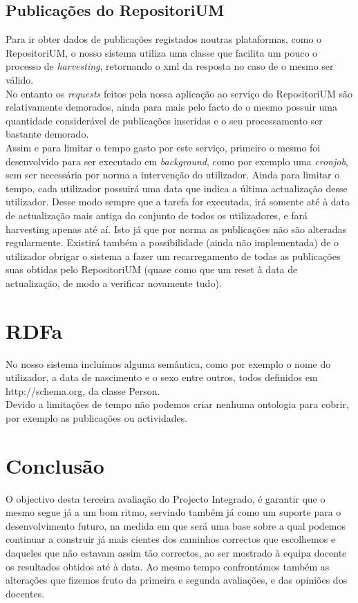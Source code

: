 \documentclass[a4paper,11pt,openright,openbib]{article}
\begin{document}
\subsection{Publicações do RepositoriUM}
Para ir obter dados de publicações registados noutras plataformas, como o RepositoriUM, o nosso sistema utiliza uma classe que facilita um pouco o processo de \emph{harvesting}, retornando o xml da resposta no caso de o mesmo ser válido.\\
No entanto os \emph{requests} feitos pela nossa aplicação ao serviço do RepositoriUM são relativamente demorados, ainda para mais pelo facto de o mesmo possuir uma quantidade considerável de publicações inseridas e o seu processamento ser bastante demorado.\\
Assim e para limitar o tempo gasto por este serviço, primeiro o mesmo foi desenvolvido para ser executado em \emph{background}, como por exemplo uma \emph{cronjob}, sem ser necessária por norma a intervenção do utilizador. Ainda para limitar o tempo, cada utilizador possuirá uma data que indica a última actualização desse utilizador. Desse modo sempre que a tarefa for executada, irá somente até à data de actualização mais antiga do conjunto de todos os utilizadores, e fará harvesting apenas até aí. Isto já que por norma as publicações não são alteradas regularmente. Existirá também a possibilidade (ainda não implementada) de o utilizador obrigar o sistema a fazer um recarregamento de todas as publicações suas obtidas pelo RepositoriUM (quase como que um reset à data de actualização, de modo a verificar novamente tudo).
\section{RDFa}
No nosso sistema incluímos alguma semântica, como por exemplo o nome do utilizador, a data de nascimento e o sexo entre outros, todos definidos em http://schema.org, da classe Person.\\
Devido a limitações de tempo não podemos criar nenhuma ontologia para cobrir, por exemplo as publicações ou actividades.
\section{Conclusão}
O objectivo desta terceira avaliação do Projecto Integrado, é garantir que o mesmo segue já a um bom ritmo, servindo também já como um suporte para o desenvolvimento futuro, na medida em que será uma base sobre a qual podemos continuar a construir já mais cientes dos caminhos correctos que escolhemos e daqueles que não estavam assim tão correctos, ao ser mostrado à equipa docente os resultados obtidos até à data. Ao mesmo tempo confrontámos também as alterações que fizemos fruto da primeira e segunda avaliações, e das opiniões dos docentes.
\end{document}
